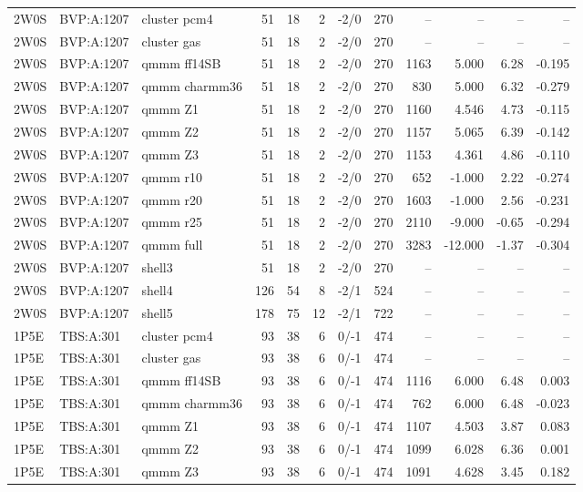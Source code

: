 {\begin{longtable}{lllrrrlrrrrr}
2W0S & BVP:A:1207 & cluster pcm4 & 51 & 18 & 2 & -2/0 & 270 & -- & -- & -- & --\\
2W0S & BVP:A:1207 & cluster gas & 51 & 18 & 2 & -2/0 & 270 & -- & -- & -- & --\\
2W0S & BVP:A:1207 & qmmm ff14SB & 51 & 18 & 2 & -2/0 & 270 & 1163 & 5.000 & 6.28 & -0.195\\
2W0S & BVP:A:1207 & qmmm charmm36 & 51 & 18 & 2 & -2/0 & 270 & 830 & 5.000 & 6.32 & -0.279\\
2W0S & BVP:A:1207 & qmmm Z1 & 51 & 18 & 2 & -2/0 & 270 & 1160 & 4.546 & 4.73 & -0.115\\
2W0S & BVP:A:1207 & qmmm Z2 & 51 & 18 & 2 & -2/0 & 270 & 1157 & 5.065 & 6.39 & -0.142\\
2W0S & BVP:A:1207 & qmmm Z3 & 51 & 18 & 2 & -2/0 & 270 & 1153 & 4.361 & 4.86 & -0.110\\
2W0S & BVP:A:1207 & qmmm r10 & 51 & 18 & 2 & -2/0 & 270 & 652 & -1.000 & 2.22 & -0.274\\
2W0S & BVP:A:1207 & qmmm r20 & 51 & 18 & 2 & -2/0 & 270 & 1603 & -1.000 & 2.56 & -0.231\\
2W0S & BVP:A:1207 & qmmm r25 & 51 & 18 & 2 & -2/0 & 270 & 2110 & -9.000 & -0.65 & -0.294\\
2W0S & BVP:A:1207 & qmmm full & 51 & 18 & 2 & -2/0 & 270 & 3283 & -12.000 & -1.37 & -0.304\\
2W0S & BVP:A:1207 & shell3 & 51 & 18 & 2 & -2/0 & 270 & -- & -- & -- & --\\
2W0S & BVP:A:1207 & shell4 & 126 & 54 & 8 & -2/1 & 524 & -- & -- & -- & --\\
2W0S & BVP:A:1207 & shell5 & 178 & 75 & 12 & -2/1 & 722 & -- & -- & -- & --\\
1P5E & TBS:A:301 & cluster pcm4 & 93 & 38 & 6 & 0/-1 & 474 & -- & -- & -- & --\\
1P5E & TBS:A:301 & cluster gas & 93 & 38 & 6 & 0/-1 & 474 & -- & -- & -- & --\\
1P5E & TBS:A:301 & qmmm ff14SB & 93 & 38 & 6 & 0/-1 & 474 & 1116 & 6.000 & 6.48 & 0.003\\
1P5E & TBS:A:301 & qmmm charmm36 & 93 & 38 & 6 & 0/-1 & 474 & 762 & 6.000 & 6.48 & -0.023\\
1P5E & TBS:A:301 & qmmm Z1 & 93 & 38 & 6 & 0/-1 & 474 & 1107 & 4.503 & 3.87 & 0.083\\
1P5E & TBS:A:301 & qmmm Z2 & 93 & 38 & 6 & 0/-1 & 474 & 1099 & 6.028 & 6.36 & 0.001\\
1P5E & TBS:A:301 & qmmm Z3 & 93 & 38 & 6 & 0/-1 & 474 & 1091 & 4.628 & 3.45 & 0.182\\

\end{longtable}}
